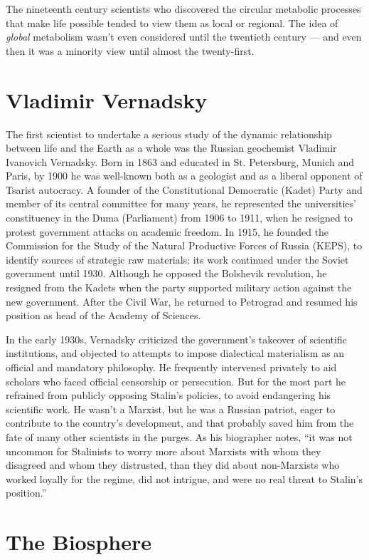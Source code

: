 \documentclass[11pt,a4paper]{article}
\begin{document}
The nineteenth century scientists who discovered the circular metabolic
processes that make life possible tended to view them as local or regional.
The idea of \emph{global} metabolism wasn’t even considered until the
twentieth century — and even then it was a minority view until almost the
twenty-first.

\section*{Vladimir Vernadsky}

The first scientist to undertake a serious study of the dynamic relationship
between life and the Earth as a whole was the Russian geochemist Vladimir
Ivanovich Vernadsky. Born in 1863 and educated in St. Petersburg, Munich and
Paris, by 1900 he was well-known both as a geologist and as a liberal opponent
of Tsarist autocracy. A founder of the Constitutional Democratic (Kadet) Party
and member of its central committee for many years, he represented the
universities’ constituency in the Duma (Parliament) from 1906 to 1911, when he
resigned to protest government attacks on academic freedom. In 1915, he
founded the Commission for the Study of the Natural Productive Forces of
Russia (KEPS), to identify sources of strategic raw materials: its work
continued under the Soviet government until 1930. Although he opposed the
Bolshevik revolution, he resigned from the Kadets when the party supported
military action against the new government. After the Civil War, he returned
to Petrograd and resumed his position as head of the Academy of Sciences.

In the early 1930s, Vernadsky criticized the government’s takeover of
scientific institutions, and objected to attempts to impose dialectical
materialism as an official and mandatory philosophy. He frequently intervened
privately to aid scholars who faced official censorship or persecution. But
for the most part he refrained from publicly opposing Stalin’s policies, to
avoid endangering his scientific work. He wasn’t a Marxist, but he was a
Russian patriot, eager to contribute to the country’s development, and that
probably saved him from the fate of many other scientists in the purges. As
his biographer notes, “it was not uncommon for Stalinists to worry more about
Marxists with whom they disagreed and whom they distrusted, than they did
about non-Marxists who worked loyally for the regime, did not intrigue, and
were no real threat to Stalin’s position.” \cite[p. 167]{3}

\section*{The Biosphere}
\end{document}
